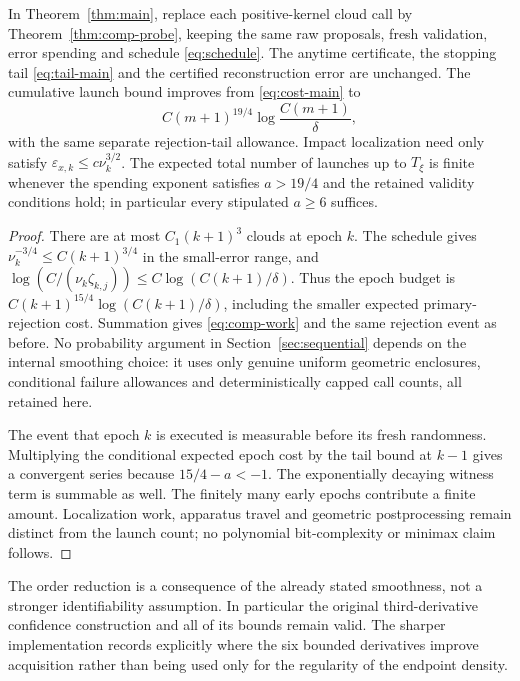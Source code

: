 \begin{corollary}\label{cor:comp-work}
In Theorem~\ref{thm:main}, replace each positive-kernel cloud call by
Theorem~\ref{thm:comp-probe}, keeping the same raw proposals, fresh
validation, error spending and schedule \eqref{eq:schedule}.
The anytime certificate, the stopping tail \eqref{eq:tail-main} and
the certified reconstruction error are unchanged. The cumulative launch
bound improves from \eqref{eq:cost-main} to
\begin{equation}\label{eq:comp-work}
 C(m+1)^{19/4}\log\frac{C(m+1)}{\delta},
\end{equation}
with the same separate rejection-tail allowance. Impact localization
need only satisfy $\varepsilon_{x,k}\le c\nu_k^{3/2}$.
The expected total number of launches up to $T_\xi$ is finite whenever
the spending exponent satisfies $a>19/4$ and the retained validity
conditions hold; in particular every stipulated $a\ge6$ suffices.
\end{corollary}
\begin{proof}
There are at most $C_1(k+1)^3$ clouds at epoch $k$.
The schedule gives $\nu_k^{-3/4}\le C(k+1)^{3/4}$ in the small-error
range, and
$\log(C/(\nu_k\zeta_{k,j}))\le C\log(C(k+1)/\delta)$.
Thus the epoch budget is
$C(k+1)^{15/4}\log(C(k+1)/\delta)$, including the smaller expected
primary-rejection cost. Summation gives \eqref{eq:comp-work} and the
same rejection event as before. No probability argument in
Section~\ref{sec:sequential} depends on the internal smoothing choice:
it uses only genuine uniform geometric enclosures, conditional failure
allowances and deterministically capped call counts, all retained here.

The event that epoch $k$ is executed is measurable before its fresh
randomness. Multiplying the conditional expected epoch cost by the tail
bound at $k-1$ gives a convergent series because
$15/4-a<-1$. The exponentially decaying witness term is summable as well.
The finitely many early epochs contribute a finite amount. Localization
work, apparatus travel and geometric postprocessing remain distinct from
the launch count; no polynomial bit-complexity or minimax claim follows.
\end{proof}

The order reduction is a consequence of the already stated smoothness,
not a stronger identifiability assumption. In particular the original
third-derivative confidence construction and all of its bounds remain
valid. The sharper implementation records explicitly where the six
bounded derivatives improve acquisition rather than being used only for
the regularity of the endpoint density.
